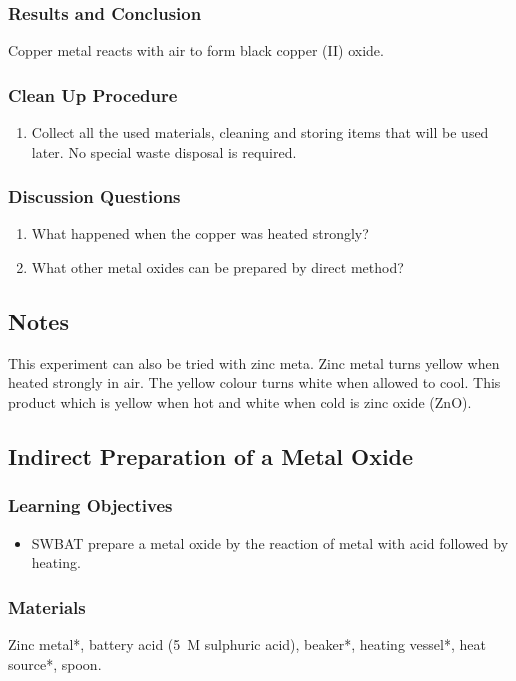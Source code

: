\subsubsection*{Results and Conclusion}
Copper metal reacts with air to form black copper (II) oxide.

\subsubsection*{Clean Up Procedure}
\begin{enumerate}
\item{Collect all the used materials, cleaning and storing items that will be used later. No special waste disposal is required.}
\end{enumerate}

\subsubsection*{Discussion Questions}
\begin{enumerate}
\item{What happened when the copper was heated strongly?}
\item{What other metal oxides can be prepared by direct method?}
\end{enumerate}
\subsection*{Notes}
This experiment can also be tried with zinc meta. Zinc metal turns yellow when heated strongly in air. The yellow colour turns white when allowed to cool. This product which is yellow when hot and white when cold is zinc oxide (ZnO).

\subsection{Indirect Preparation of a Metal Oxide}

\subsubsection*{Learning Objectives}
\begin{itemize}
\item{SWBAT prepare a metal oxide by the reaction of metal with acid followed by heating.}
\end{itemize}

\subsubsection*{Materials}
Zinc metal*, battery acid (5~M sulphuric acid), beaker*, heating vessel*, heat source*, spoon.

